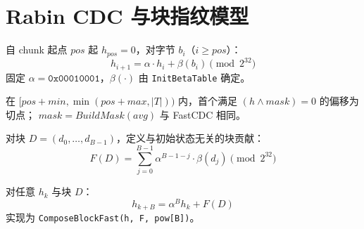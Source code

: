 \chapter{Rabin CDC 与块指纹模型}
\label{ch:model}

\begin{definition}
自 chunk 起点 $pos$ 起 $h_{pos}=0$，对字节 $b_i$（$i\ge pos$）：
\begin{equation}
  h_{i+1} = \alpha \cdot h_i + \beta(b_i) \pmod{2^{32}}
\end{equation}
固定 $\alpha=\texttt{0x00010001}$，$\beta(\cdot)$ 由 \texttt{InitBetaTable} 确定。
\end{definition}

\begin{definition}[切点]
在 $[\mathit{pos}+\mathit{min},\min(\mathit{pos}+\mathit{max},|T|))$ 内，首个满足 $(h\wedge\mathit{mask})=0$ 的偏移为切点；
$\mathit{mask}=\mathit{BuildMask}(\mathit{avg})$ 与 FastCDC 相同。
\end{definition}

\begin{definition}[块指纹]
对块 $D=(d_0,\ldots,d_{B-1})$，定义与初始状态无关的块贡献：
\begin{equation}
  F(D) = \sum_{j=0}^{B-1} \alpha^{B-1-j}\cdot\beta(d_j) \pmod{2^{32}}
\end{equation}
\end{definition}

\begin{proposition}[块合成]
对任意 $h_k$ 与块 $D$：
\begin{equation}
  h_{k+B} = \alpha^B h_k + F(D)
\end{equation}
实现为 \texttt{ComposeBlockFast(h, F, pow[B])}。
\end{proposition}
